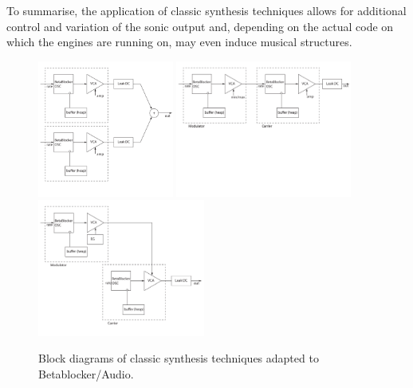 \documentclass[letterpaper, 12pt]{article}
\begin{document}
To summarise, the application of classic synthesis techniques allows for additional control and variation of the sonic output and, depending on the actual code on which the engines are running on, may even induce musical structures.


\begin{figure}
	\centering
		\includegraphics[height=4.5cm]{Additive-Betablocker}
		\includegraphics[height=4.5cm]{FM-Betablocker}
		\includegraphics[height=4.5cm]{AM-Betablocker}
	\caption{Block diagrams of classic synthesis techniques adapted to Betablocker/Audio.}
	\label{fig:classicSynthesisTechniquesFMAMAdditive}
\end{figure}
\end{document}
